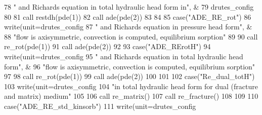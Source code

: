 \begin{DoxyCode}
{{78 \textcolor{comment}{          }\textcolor{stringliteral}{" and Richards equation in total hydraulic head form in"}, &
79            drutes_config%
80 \textcolor{comment}{           }
81 \textcolor{comment}{           }\textcolor{keyword}{call }restdh(pde(1))
82            \textcolor{keyword}{call }ade(pde(2))
83 
84 
85       \textcolor{keywordflow}{case}(\textcolor{stringliteral}{"ADE\_RE\_rot"})
86           \textcolor{keyword}{write}(unit=drutes_config%
87 \textcolor{comment}{          }\textcolor{stringliteral}{" and Richards equation in pressure head form"}, &
88            \textcolor{stringliteral}{"flow is axisymmetric, convection is computed, equilibrium sorption"}\textcolor{comment}{ }
89 \textcolor{comment}{           }
90 \textcolor{comment}{           }\textcolor{keyword}{call }re_rot(pde(1))
91            \textcolor{keyword}{call }ade(pde(2))
92            
93       \textcolor{keywordflow}{case}(\textcolor{stringliteral}{"ADE\_RErotH"})
94           \textcolor{keyword}{write}(unit=drutes_config%
95 \textcolor{comment}{          }\textcolor{stringliteral}{" and Richards equation in total hydraulic head form"}, &
96            \textcolor{stringliteral}{"flow is axisymmetric, convection is computed, equilibrium sorption"}\textcolor{comment}{ }
97 \textcolor{comment}{           }
98 \textcolor{comment}{           }\textcolor{keyword}{call }re_rot(pde(1))
99            \textcolor{keyword}{call }ade(pde(2))           
100           
101 
102       \textcolor{keywordflow}{case}(\textcolor{stringliteral}{"Re\_dual\_totH"})
103                         \textcolor{keyword}{write}(unit=drutes_config%
104           \textcolor{stringliteral}{"in total hydraulic head form for dual (fracture and matrix) medium"}\textcolor{comment}{  }
105 \textcolor{comment}{           }
106 \textcolor{comment}{           }\textcolor{keyword}{call }re_matrix()
107            \textcolor{keyword}{call }re_fracture()  
108 
109 
110       \textcolor{keywordflow}{case}(\textcolor{stringliteral}{"ADE\_RE\_std\_kinsorb"})
111           \textcolor{keyword}{write}(unit=drutes_config%
}}
\end{DoxyCode}
